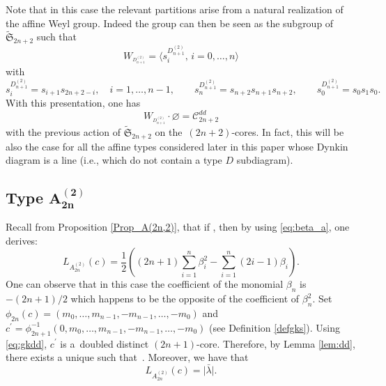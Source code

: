 \documentclass[pdftex]{sigma}
\numberwithin{equation}{section}
\newcommand{\cC}{\mathcal{C}}
\begin{document}
\begin{Remark}
 Note that in this case the relevant partitions arise from a natural realization of the affine Weyl group. Indeed the group  can then be seen as the subgroup of $\widetilde{
	\mathfrak{S}}_{2n+2}$ such that%
\begin{equation*}
W_{^{D_{n+1}^{(2)}}}=\bigl\langle s_{i}^{D_{n+1}^{(2)}},\, i=0,\dots ,n\bigr\rangle
\end{equation*}
	with
\[
s_{i}^{D_{n+1}^{(2)}}=s_{i+1}s_{2n+2-i},\quad i=1,\dots ,n-1 ,\qquad
s_{n}^{D_{n+1}^{(2)}}=s_{n+2}s_{n+1}s_{n+2}, \qquad
s_{0}^{D_{n+1}^{(2)}}=s_0s_1 s_{0}.
\]
With this presentation, one has
\[
W_{^{D_{n+1}^{(2)}}}\cdot \varnothing =\cC_{2n+2}^{dd}
\]
 with the previous action of
$\widetilde{ \mathfrak{S}}_{2n+2}$ on the~$(2n+2)$-cores. In fact, this will be also the case for all the affine types considered later in this paper whose Dynkin diagram is a line (i.e., which do not contain a type $D$ subdiagram).
\end{Remark}


\subsection[Type A\_\{2n\}\^{}(2)]{Type $\boldsymbol{A_{2n}^{(2)}}$}

Recall from Proposition \ref{Prop_A(2n,2)}, that if  , then by using \eqref{eq:beta_a}, one derives:
\begin{equation*}
L_{A_{2n}^{(2)}}(c)=\frac{1}{2}\left( (2n+1)\sum_{i=1}^{n}\beta
_{i}^{2}-\sum_{i=1}^{n}(2i-1)\beta _{i}\right) .
\end{equation*}%
One can observe that in this case the coefficient of the monomial $\beta _{n}
$ is $-(2n+1)/2$ which happens to be the opposite of the coefficient of $%
\beta _{n}^{2}$. Set $\phi _{2n}(c)=(m_{0},\dots ,m_{n-1},-m_{n-1},\dots
,-m_{0})$ and $c^{\prime }=\phi _{2n+1}^{-1}(0,m_{0},\dots
,m_{n-1},-m_{n-1},\dots ,-m_{0})$ (see Definition \ref{defgks}). Using %
\eqref{eq:gkdd}, $c^{\prime }$ is a~doubled distinct $(2n+1)$-core.
Therefore, by Lemma \ref{lem:dd}, there exists a unique \smash{$\bar{\lambda}\in \cC_{2n+1}^{d,r}$} such that~. Moreover,
we have that
\begin{equation*}
L_{A_{2n}^{(2)}}(c)=\bigl\lvert \bar{\lambda}\bigr\rvert .
\end{equation*}
\end{document}
